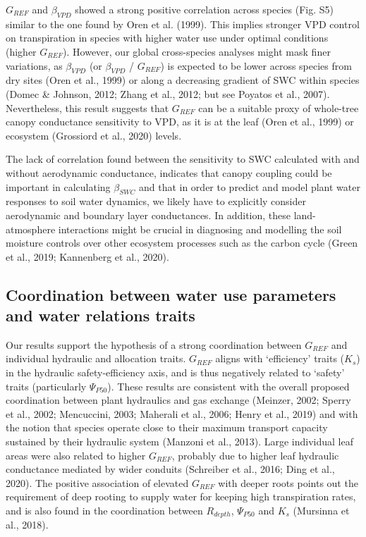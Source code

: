 \documentclass[11pt,twoside]{reedthesis}
\begin{document}
\(G_{REF}\) and \(\beta_{VPD}\) showed a strong positive correlation
across species (Fig. S5) similar to the one found by Oren et al. (1999).
This implies stronger VPD control on transpiration in species with
higher water use under optimal conditions (higher \(G_{REF}\)). However,
our global cross-species analyses might mask finer variations, as
\(\beta_{VPD}\) (or \(\beta_{VPD}\) / \(G_{REF}\)) is expected to be
lower across species from dry sites (Oren et al., 1999) or along a
decreasing gradient of SWC within species (Domec \& Johnson, 2012; Zhang
et al., 2012; but see Poyatos et al., 2007). Nevertheless, this result
suggests that \(G_{REF}\) can be a suitable proxy of whole-tree canopy
conductance sensitivity to VPD, as it is at the leaf (Oren et al., 1999)
or ecosystem (Grossiord et al., 2020) levels.\par

The lack of correlation found between the sensitivity to SWC calculated
with and without aerodynamic conductance, indicates that canopy coupling
could be important in calculating \(\beta_{SWC}\) and that in order to
predict and model plant water responses to soil water dynamics, we
likely have to explicitly consider aerodynamic and boundary layer
conductances. In addition, these land-atmosphere interactions might be
crucial in diagnosing and modelling the soil moisture controls over
other ecosystem processes such as the carbon cycle (Green et al., 2019;
Kannenberg et al., 2020).\par

\subsection{Coordination between water use parameters and water
relations
traits}\label{coordination-between-water-use-parameters-and-water-relations-traits}

Our results support the hypothesis of a strong coordination between
\(G_{REF}\) and individual hydraulic and allocation traits. \(G_{REF}\)
aligns with `efficiency' traits (\(K_s\)) in the hydraulic
safety-efficiency axis, and is thus negatively related to `safety'
traits (particularly \(\Psi_{P50}\)). These results are consistent with
the overall proposed coordination between plant hydraulics and gas
exchange (Meinzer, 2002; Sperry et al., 2002; Mencuccini, 2003; Maherali
et al., 2006; Henry et al., 2019) and with the notion that species
operate close to their maximum transport capacity sustained by their
hydraulic system (Manzoni et al., 2013). Large individual leaf areas
were also related to higher \(G_{REF}\), probably due to higher leaf
hydraulic conductance mediated by wider conduits (Schreiber et al.,
2016; Ding et al., 2020). The positive association of elevated
\(G_{REF}\) with deeper roots points out the requirement of deep rooting
to supply water for keeping high transpiration rates, and is also found
in the coordination between \(R_{depth}\), \(\Psi_{P50}\) and \(K_s\)
(Mursinna et al., 2018).\par
\end{document}
